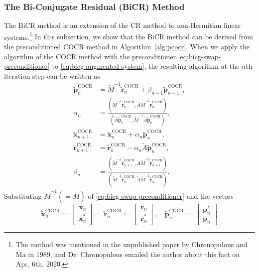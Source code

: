\subsubsection{{The Bi-Conjugate Residual (BiCR) Method}}\label{subsec:bicr-method}
{The BiCR method  is an extension of the CR method to non-Hermitian linear systems.}\footnote{{The method was mentioned in the unpublished paper  by Chronopulous and Ma in 1989, and Dr. Chronopulous emailed the author about this fact on Apr. 6th, 2020.}}
{In this subsection, we show that the BiCR method can be derived from the preconditioned COCR method in Algorithm\ \ref{alg:pcocr}. When we apply the algorithm of the COCR method with the preconditioner \eqref{eq:bicg-swap-preconditioner} to \eqref{eq:bicg-augmented-system}, the resulting algorithm at the $n$th iteration step can be written as}
\[\begin{aligned}
\widetilde{\bm p}_n^{\mathrm{COCR}}&=\widetilde M^{-1}\widetilde{\bm r}_n^{\mathrm{COCR}}+\beta_{n-1}\widetilde{\bm p}_{n-1}^{\mathrm{COCR}},\\
\alpha_n&=\frac{(\overline{\widetilde M^{-1}\widetilde{\bm r}_n^{\mathrm{COCR}}},\widetilde A\widetilde M^{-1}\widetilde{\bm r}_n^{\mathrm{COCR}})}{(\overline{\widetilde A\widetilde{\bm p}_n^{\mathrm{COCR}}},\widetilde M^{-1}\widetilde A\widetilde{\bm p}_n^{\mathrm{COCR}})},\\
\widetilde{\bm x}_{n+1}^{\mathrm{COCR}}&=\widetilde{\bm x}_n^{\mathrm{COCR}}+\alpha_n\widetilde{\bm p}_n^{\mathrm{COCR}},\\
\widetilde{\bm r}_{n+1}^{\mathrm{COCR}}&=\widetilde{\bm r}_n^{\mathrm{COCR}}-\alpha_n\widetilde A\widetilde{\bm p}_n^{\mathrm{COCR}},\\
\beta_n&=\frac{(\overline{\widetilde M^{-1}\widetilde{\bm r}_{n+1}^{\mathrm{COCR}}},\widetilde A\widetilde M^{-1}\widetilde{\bm r}_{n+1}^{\mathrm{COCR}})}{(\overline{\widetilde M^{-1}\widetilde{\bm r}_n^{\mathrm{COCR}}},\widetilde A\widetilde M^{-1}\widetilde{\bm r}_n^{\mathrm{COCR}})}.
\end{aligned}\]
{Substituting $\widetilde M^{-1}(=\widetilde M)$ of \eqref{eq:bicg-swap-preconditioner} and the vectors}
\[\widetilde{\bm x}_n^{\mathrm{COCR}}:=\begin{bmatrix}\bm x_n\\\bar{\bm x}_n^{*}\end{bmatrix},\quad\widetilde{\bm r}_n^{\mathrm{COCR}}:=\begin{bmatrix}\bm r_n\\\bar{\bm r}_n^{*}\end{bmatrix},\quad\widetilde{\bm p}_n^{\mathrm{COCR}}:=\begin{bmatrix}\bar{\bm p}_n^{*}\\\bm p_n\end{bmatrix}\]
